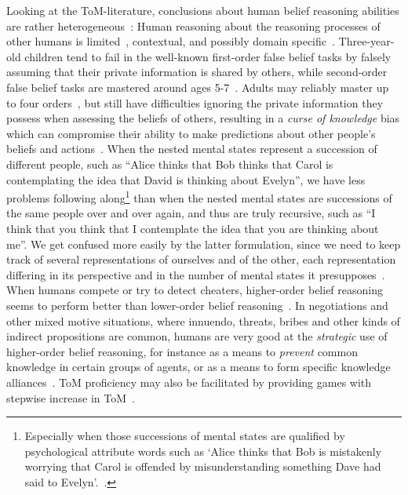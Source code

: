 \documentclass[twocolumn,a4paper,superscriptaddress,nofootinbib]{revtex4}
\begin{document}
Looking at the ToM-literature, conclusions about human belief reasoning abilities are rather heterogeneous~\citep{apperly2009humans, saxe2013theory}: Human reasoning about the reasoning processes of other humans is limited~\citep{premack1978does, gopnik1988children, stahl1995players, nagel1995unraveling, hedden2002you, keysar2003limits, pinker2003language}, contextual, and possibly domain specific~\citep{leslie1992domain, saxe2009theory, heyes2014submentalizing}. Three-year-old children tend to fail in the well-known first-order false belief tasks by falsely assuming that their private information is shared by others, while second-order false belief tasks are mastered around ages 5-7~\citep{perner1985john, sullivan1994preschoolers}. Adults may reliably master up to four orders~\citep{kinderman1998theory}, but still have difficulties ignoring the private information they possess when assessing the beliefs of others, resulting in a \textit{curse of knowledge} bias which can compromise their ability to make predictions about other people’s beliefs and actions~\citep{camerer1989curse, birch2007curse}. When the nested mental states represent a succession of different people, such as ``Alice thinks that Bob thinks that Carol is contemplating the idea that David is thinking about Evelyn'', we have less problems following along\footnote{Especially when those successions of mental states are qualified by psychological attribute words such as `Alice thinks that Bob is mistakenly worrying that Carol is offended by misunderstanding something Dave had said to Evelyn'.~\citep{academian2019unrolling}.
} than when the nested mental states are successions of the same people over and over again, and thus are truly recursive, such as ``I think that you think that I contemplate the idea that you are thinking about me''. We get confused more easily by the latter formulation, since we need to keep track of several representations of ourselves and of the other, each representation differing in its perspective and in the number of mental states it presupposes~\citep{de2019common}. When humans compete or try to detect cheaters, higher-order belief reasoning seems to perform better than lower-order belief reasoning~\citep{goodie2012levels}. In negotiations and other mixed motive situations, where innuendo, threats, bribes and other kinds of indirect propositions are common, humans are very good at the \textit{strategic} use of higher-order belief reasoning, for instance as a means to \emph{prevent} common knowledge in certain groups of agents, or as a means to form specific knowledge alliances~\citep{pinker2007stuff, pinker2008logic, de2017negotiating}. ToM proficiency may also be facilitated by providing games with stepwise increase in ToM~\citep{verbrugge2018stepwise}.
\end{document}
